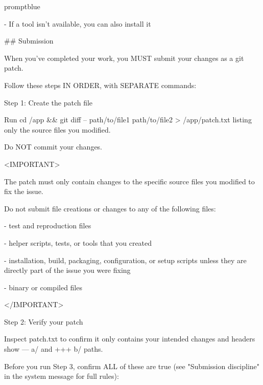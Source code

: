 \begin{promptbox}{promptblue}
{- If a tool isn't available, you can also install it\par
\vspace{0.35em}\par
\#\# Submission\par
\vspace{0.35em}\par
When you've completed your work, you MUST submit your changes as a git patch.\par
Follow these steps IN ORDER, with SEPARATE commands:\par
\vspace{0.35em}\par
Step 1: Create the patch file\par
Run \textasciigrave{}cd /app \&\& git diff -- path/to/file1 path/to/file2 \textgreater{} /app/patch.txt\textasciigrave{} listing only the source files you modified.\par
Do NOT commit your changes.\par
\vspace{0.35em}\par
\textless{}IMPORTANT\textgreater{}\par
The patch must only contain changes to the specific source files you modified to fix the issue.\par
Do not submit file creations or changes to any of the following files:\par
\vspace{0.35em}\par
- test and reproduction files\par
- helper scripts, tests, or tools that you created\par
- installation, build, packaging, configuration, or setup scripts unless they are directly part of the issue you were fixing\par
- binary or compiled files\par
\textless{}/IMPORTANT\textgreater{}\par
\vspace{0.35em}\par
Step 2: Verify your patch\par
Inspect patch.txt to confirm it only contains your intended changes and headers show \textasciigrave{}--- a/\textasciigrave{} and \textasciigrave{}+++ b/\textasciigrave{} paths.\par
\vspace{0.35em}\par
Before you run Step 3, confirm ALL of these are true (see "Submission discipline" in the system message for full rules):\par
}
\end{promptbox}
